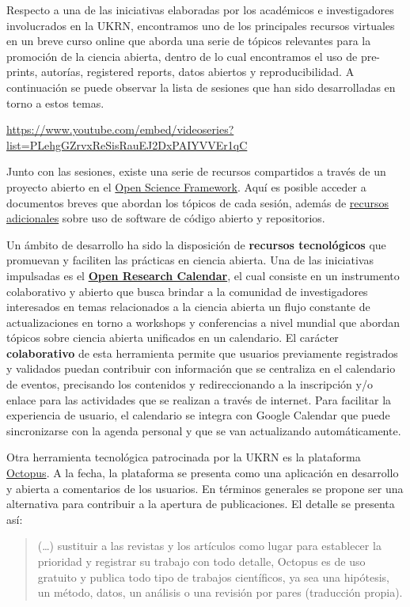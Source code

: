 \documentclass[
  spanish,
  letterpaper,
  DIV=11,
  numbers=noendperiod]{scrreprt}
\begin{document}
Respecto a una de las iniciativas elaboradas por los académicos e
investigadores involucrados en la UKRN, encontramos uno de los
principales recursos virtuales en un breve curso online que aborda una
serie de tópicos relevantes para la promoción de la ciencia abierta,
dentro de lo cual encontramos el uso de pre-prints, autorías, registered
reports, datos abiertos y reproducibilidad. A continuación se puede
observar la lista de sesiones que han sido desarrolladas en torno a
estos temas.

\url{https://www.youtube.com/embed/videoseries?list=PLehgGZrvxReSisRauEJ2DxPAIYVVEr1qC}

Junto con las sesiones, existe una serie de recursos compartidos a
través de un proyecto abierto en el \href{https://osf.io/x8j9q/}{Open
Science Framework}. Aquí es posible acceder a documentos breves que
abordan los tópicos de cada sesión, además de
\href{https://osf.io/qw9ck/}{recursos adicionales} sobre uso de software
de código abierto y repositorios.

Un ámbito de desarrollo ha sido la disposición de \textbf{recursos
tecnológicos} que promuevan y faciliten las prácticas en ciencia
abierta. Una de las iniciativas impulsadas es el
\href{https://openresearchcalendar.org/}{\textbf{Open Research
Calendar}}, el cual consiste en un instrumento colaborativo y abierto
que busca brindar a la comunidad de investigadores interesados en temas
relacionados a la ciencia abierta un flujo constante de actualizaciones
en torno a workshops y conferencias a nivel mundial que abordan tópicos
sobre ciencia abierta unificados en un calendario. El carácter
\textbf{colaborativo} de esta herramienta permite que usuarios
previamente registrados y validados puedan contribuir con información
que se centraliza en el calendario de eventos, precisando los contenidos
y redireccionando a la inscripción y/o enlace para las actividades que
se realizan a través de internet. Para facilitar la experiencia de
usuario, el calendario se integra con Google Calendar que puede
sincronizarse con la agenda personal y que se van actualizando
automáticamente.

Otra herramienta tecnológica patrocinada por la UKRN es la plataforma
\href{https://science-octopus.org/}{Octopus}. A la fecha, la plataforma
se presenta como una aplicación en desarrollo y abierta a comentarios de
los usuarios. En términos generales se propone ser una alternativa para
contribuir a la apertura de publicaciones. El detalle se presenta así:

\begin{quote}
(\ldots) sustituir a las revistas y los artículos como lugar para
establecer la prioridad y registrar su trabajo con todo detalle, Octopus
es de uso gratuito y publica todo tipo de trabajos científicos, ya sea
una hipótesis, un método, datos, un análisis o una revisión por pares
(traducción propia).
\end{quote}
\end{document}
